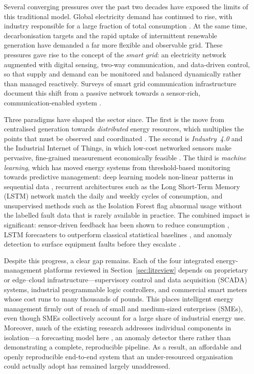 \documentclass[conference]{IEEEtran}
\begin{document}
Several converging pressures over the past two decades have exposed the limits
of this traditional model. Global electricity demand has continued to rise, with
industry responsible for a large fraction of total consumption
\cite{international2022international}. At the same time, decarbonisation targets
and the rapid uptake of intermittent renewable generation have demanded a far
more flexible and observable grid. These pressures gave rise to the concept of
the \emph{smart grid}: an electricity network augmented with digital sensing,
two-way communication, and data-driven control, so that supply and demand can be
monitored and balanced dynamically rather than managed reactively. Surveys of
smart grid communication infrastructure document this shift from a passive
network towards a sensor-rich, communication-enabled system
\cite{fan2012smart,yan2012survey}.

Three paradigms have shaped the sector since. The first is the move from
centralised generation towards \emph{distributed} energy resources, which
multiplies the points that must be observed and coordinated
\cite{silva2023iot}. The second is \emph{Industry~4.0} and the Industrial
Internet of Things, in which low-cost networked sensors make pervasive,
fine-grained measurement economically feasible
\cite{munirathinam2020industry}. The third is \emph{machine learning}, which
has moved energy systems from threshold-based monitoring towards predictive
management: deep learning models non-linear patterns in sequential data
\cite{lecun2015deep}, recurrent architectures such as the Long Short-Term
Memory (LSTM) network \cite{hochreiter1997long} match the daily and weekly
cycles of consumption, and unsupervised methods such as the Isolation Forest
\cite{liu2008isolation} flag abnormal usage without the labelled fault data
that is rarely available in practice. The combined impact is significant:
sensor-driven feedback has been shown to reduce consumption
\cite{alaa2017review,hafeez2020efficient}, LSTM forecasters to outperform
classical statistical baselines \cite{kong2017short,raza2015review}, and
anomaly detection to surface equipment faults before they escalate
\cite{himeur2021artificial}.

Despite this progress, a clear gap remains. Each of the four integrated
energy-management platforms reviewed in Section~\ref{sec:litreview}
\cite{silva2023iot,vijayalakshmi2023smart,bin2022real,ahmed2020machine}
depends on proprietary or edge--cloud infrastructure---supervisory control and
data acquisition (SCADA) systems,
industrial programmable logic controllers, and commercial smart meters whose
cost runs to many thousands of pounds. This places intelligent energy management
firmly out of reach of small and medium-sized enterprises (SMEs), even though
SMEs collectively account for a large share of industrial energy use. Moreover,
much of the existing research addresses individual components in isolation---a forecasting model here \cite{wen2024deep}, an anomaly detector there
\cite{pereira2018unsupervised} rather than demonstrating a complete,
reproducible pipeline. As a result, an affordable and openly reproducible
end-to-end system that an under-resourced organisation could actually adopt has
remained largely unaddressed.
\end{document}
